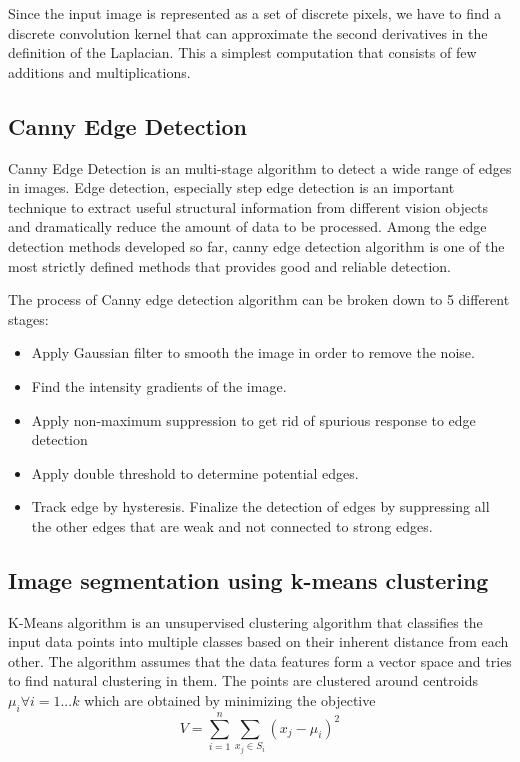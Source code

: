 \documentclass[conference]{IEEEtran}
\begin{document}
Since the input image is represented as a set of discrete pixels, we have to find a discrete convolution kernel that can approximate the second derivatives in the definition of the Laplacian. This a simplest computation that consists of few additions and multiplications.

\subsection{Canny Edge Detection}
Canny Edge Detection\cite{Canny86} is an multi-stage algorithm to detect a wide range of edges in images. Edge detection, especially step edge detection is an important technique to extract useful structural information from different vision objects and dramatically reduce the amount of data to be processed. Among the edge detection methods developed so far, canny edge detection algorithm is one of the most strictly defined methods that provides good and reliable detection.

The process of Canny edge detection algorithm can be broken down to 5 different stages:

\begin{itemize}
	\item Apply Gaussian filter to smooth the image in order to remove the noise.
	\item Find the intensity gradients of the image.
	\item Apply non-maximum suppression to get rid of spurious response to edge detection
	\item Apply double threshold to determine potential edges.
	\item Track edge by hysteresis. Finalize the detection of edges by suppressing all the other edges that are weak and not connected to strong edges. 
\end{itemize}


\subsection{Image segmentation using k-means clustering}
K-Means algorithm is an unsupervised clustering algorithm that classifies the input data points into multiple classes based on their inherent distance from each other. The algorithm assumes that the data features form a vector space and tries to find natural clustering in them. The points are clustered around centroids \begin{math}\mu_{i} \forall i = 1...k\end{math} which are obtained by minimizing the objective
\begin{equation}
	V = \sum\limits_{i=1}^n \sum\limits_{x_{j}\in S_{i}} (x_{j} - \mu_{i})^2
\end{equation}
\end{document}
